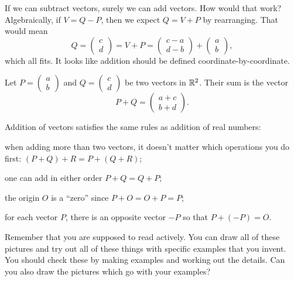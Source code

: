 \documentclass[00-livre-main.tex]{subfiles}
\begin{document}
If we can subtract vectors, surely we can add vectors. How would that work? Algebraically, if $V=Q-P$, then we expect $Q = V+P$ by rearranging. 
That would mean
\[
Q = \begin{pmatrix} c \\ d \end{pmatrix} = V + P = \begin{pmatrix} c-a \\ d-b \end{pmatrix} + \begin{pmatrix} a \\ b \end{pmatrix},
\]
which all fits. It looks like addition should be defined coordinate-by-coordinate.

\begin{definition}
Let $P = \left(\begin{smallmatrix} a\\ b\end{smallmatrix}\right)$ and $Q= \left(\begin{smallmatrix} c\\ d\end{smallmatrix}\right)$ be two vectors in $\mathbb{R}^2$. Their sum is the vector
\[
P+Q = \begin{pmatrix} a+c \\ b+d\end{pmatrix}.
\]
\end{definition}

\begin{theorem}
Addition of vectors satisfies the same rules as addition of real numbers:
\begin{compactitem}
\item when adding more than two vectors, it doesn't matter which operations you do first:
$(P+Q)+R = P + (Q+R)$;
\item one can add in either order $P+Q = Q+P$;
\item the origin $O$ is a ``zero'' since $P+O = O+P = P$;
\item for each vector $P$, there is an opposite vector $-P$ so that $P + (-P) = O$.
\end{compactitem}
\end{theorem}

Remember that you are supposed to read actively. 
You can draw all of these pictures and try out all of these things with specific examples that you invent.
You should check these by making examples and working out the details.
Can you also draw the pictures which go with your examples?
\end{document}
